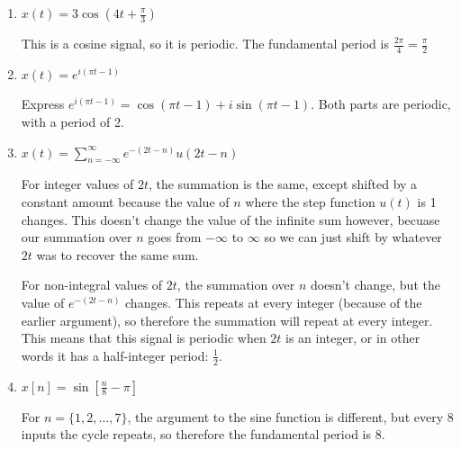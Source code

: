 \documentclass[10pt]{article}
\begin{document}
	\begin{enumerate}[label=\alph*)]
		\item \( x(t) = 3 \cos(4t + \frac{\pi}{3}) \) 

			\begin{solution}
				This is a cosine signal, so it is periodic. The fundamental period is 
				\( \frac{2\pi}{4} = \frac{\pi}{2}\)  
			\end{solution}
		\item \( x(t) = e^{i(\pi t - 1)} \) 

			\begin{solution}
				Express \( e^{i(\pi t - 1)} = \cos(\pi t - 1) + i \sin(\pi t - 1) \). Both parts are periodic, 
				with a period of 2. 
			\end{solution}
		\item \( x(t) = \sum_{n = -\infty}^{\infty} e^{-(2t - n)}u(2t -n) \) 

			\begin{solution}
				For integer values of \( 2t \), the summation is the same, except shifted by a constant amount because 
				the value of \( n \) where the step function \( u(t) \) is 1 changes. This doesn't change the value of 
				the infinite sum however, becuase our summation over \( n \) goes from \( -\infty \) to 
				\( \infty \) so we can just shift by whatever \( 2t \) was to recover the same sum. 

				For non-integral values of \( 2t \), the summation over \( n \) doesn't change, but the value 
				of \( e^{-(2t - n)} \) changes. This repeats at every integer (because of the earlier argument), so 
				therefore the summation will repeat at every integer. This means that this signal is periodic 
				when \( 2t \) is an integer, or in other words it has a half-integer period: \( \frac{1}{2} \).   
			\end{solution}
		\item \( x[n] = \sin[\frac{n}{8} - \pi] \)

			\begin{solution}
				For \( n = \{1, 2, \dots, 7\} \), the argument to the sine function is different, but every \( 8 \) 
				inputs the cycle repeats, so therefore the fundamental period is 8.
			\end{solution}
	\end{enumerate}
	\pagebreak
\end{document}
